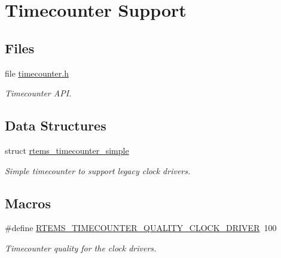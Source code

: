 \hypertarget{group__SAPITimecounter}{}\section{Timecounter Support}
\label{group__SAPITimecounter}
\subsection*{Files}
\begin{DoxyCompactItemize}
\item 
file \mbox{\hyperlink{timecounter_8h}{timecounter.\+h}}
\begin{DoxyCompactList}\small\item\em Timecounter A\+PI. \end{DoxyCompactList}\end{DoxyCompactItemize}
\subsection*{Data Structures}
\begin{DoxyCompactItemize}
\item 
struct \mbox{\hyperlink{structrtems__timecounter__simple}{rtems\+\_\+timecounter\+\_\+simple}}
\begin{DoxyCompactList}\small\item\em Simple timecounter to support legacy clock drivers. \end{DoxyCompactList}\end{DoxyCompactItemize}
\subsection*{Macros}
\begin{DoxyCompactItemize}
\item 
\#define \mbox{\hyperlink{group__SAPITimecounter_ga509ef767dcae10363b53e02b0205398c}{R\+T\+E\+M\+S\+\_\+\+T\+I\+M\+E\+C\+O\+U\+N\+T\+E\+R\+\_\+\+Q\+U\+A\+L\+I\+T\+Y\+\_\+\+C\+L\+O\+C\+K\+\_\+\+D\+R\+I\+V\+ER}}~100
\begin{DoxyCompactList}\small\item\em Timecounter quality for the clock drivers. \end{DoxyCompactList}\end{DoxyCompactItemize}
